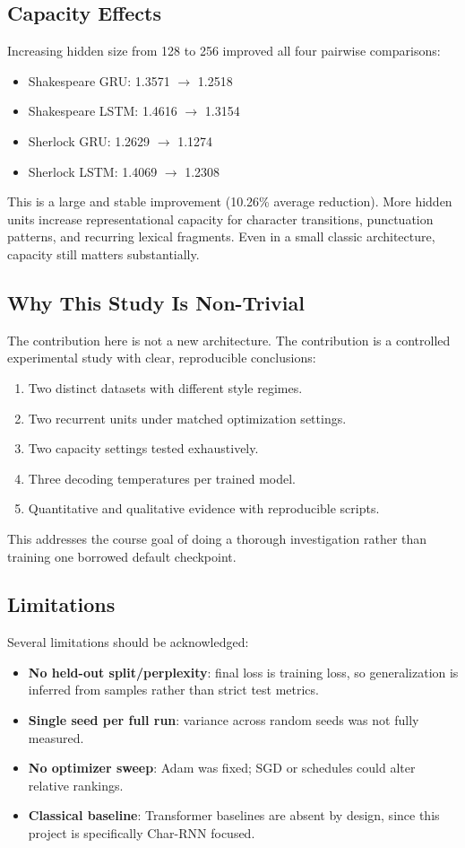 \documentclass[10pt,twocolumn,letterpaper]{article}
\begin{document}
\subsection{Capacity Effects}
Increasing hidden size from 128 to 256 improved all four pairwise comparisons:
\begin{itemize}
\item Shakespeare GRU: 1.3571 $\rightarrow$ 1.2518
\item Shakespeare LSTM: 1.4616 $\rightarrow$ 1.3154
\item Sherlock GRU: 1.2629 $\rightarrow$ 1.1274
\item Sherlock LSTM: 1.4069 $\rightarrow$ 1.2308
\end{itemize}

This is a large and stable improvement (10.26\% average reduction). More hidden units increase representational capacity for character transitions, punctuation patterns, and recurring lexical fragments. Even in a small classic architecture, capacity still matters substantially.

\subsection{Why This Study Is Non-Trivial}
The contribution here is not a new architecture. The contribution is a controlled experimental study with clear, reproducible conclusions:
\begin{enumerate}
\item Two distinct datasets with different style regimes.
\item Two recurrent units under matched optimization settings.
\item Two capacity settings tested exhaustively.
\item Three decoding temperatures per trained model.
\item Quantitative and qualitative evidence with reproducible scripts.
\end{enumerate}

This addresses the course goal of doing a thorough investigation rather than training one borrowed default checkpoint.

\subsection{Limitations}
\label{sec:limitations}
Several limitations should be acknowledged:
\begin{itemize}
\item \textbf{No held-out split/perplexity}: final loss is training loss, so generalization is inferred from samples rather than strict test metrics.
\item \textbf{Single seed per full run}: variance across random seeds was not fully measured.
\item \textbf{No optimizer sweep}: Adam was fixed; SGD or schedules could alter relative rankings.
\item \textbf{Classical baseline}: Transformer baselines are absent by design, since this project is specifically Char-RNN focused.
\end{itemize}
\end{document}
